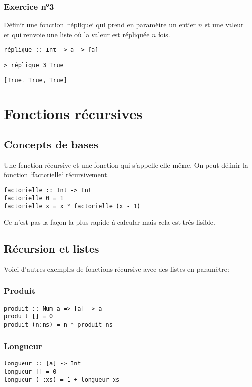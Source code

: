 \documentclass[11pt]{article}
\begin{document}
\subsubsection{Exercice n°3}
\label{sec:orgf2875cd}
Définir une fonction `réplique` qui prend en paramètre un entier \(n\) et une valeur et qui renvoie une liste où la valeur est répliquée \(n\) fois.

\begin{verbatim}
réplique :: Int -> a -> [a]
\end{verbatim}

\begin{verbatim}
> réplique 3 True
\end{verbatim}
\begin{verbatim}
[True, True, True]
\end{verbatim}

\section{Fonctions récursives}
\label{sec:orgeaa4277}

\subsection{Concepts de bases}
\label{sec:org2d651f4}
Une fonction récursive et une fonction qui s'appelle elle-même. On peut définir la fonction `factorielle` récursivement.
\begin{verbatim}
factorielle :: Int -> Int
factorielle 0 = 1
factorielle x = x * factorielle (x - 1)
\end{verbatim}
Ce n'est pas la façon la plus rapide à calculer mais cela est très lisible.

\subsection{Récursion et listes}
\label{sec:org3f64e04}
Voici d'autres exemples de fonctions récursive avec des listes en paramètre:

\subsubsection{Produit}
\label{sec:orgc4d516a}
\begin{verbatim}
produit :: Num a => [a] -> a
produit [] = 0
produit (n:ns) = n * produit ns
\end{verbatim}

\subsubsection{Longueur}
\label{sec:org74120ec}
\begin{verbatim}
longueur :: [a] -> Int
longueur [] = 0
longueur (_:xs) = 1 + longueur xs
\end{verbatim}
\end{document}

